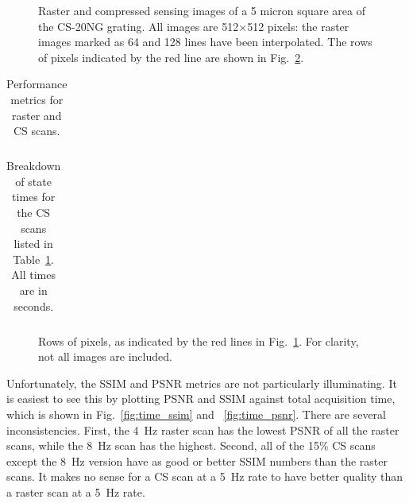 \documentclass[twocolumn,oneside]{IEEEtran/IEEEtran}
\begin{document}
\begin{figure}
  
  \caption{Raster and compressed sensing images of a 5 micron square area of the
     CS-20NG grating. All images are 512$\times$512 pixels: the raster images marked as 64 and 128 lines have been interpolated. The rows of pixels
     indicated by the red line are shown in Fig.~\ref{fig:pixel_rows}.}
  \label{fig:resultsF1_images}
\end{figure}



\begin{table}[t!]
  \centering
  \caption{Performance metrics for raster and CS scans.}
  \begin{tabular}{cccccc}
    
  \end{tabular}
  \label{tab:rast_vs_cs_v1}
\end{table}

\begin{table}[t!]
  \centering
  \caption{Breakdown of state times for the CS scans listed in
    Table~\ref{tab:rast_vs_cs_v1}. All times are in seconds.}
  \label{tab:final_state_times}
  \begin{tabular}{ccccccc}
    
  \end{tabular}
\end{table}

\begin{figure}[t!]
  
  \caption{Rows of pixels, as indicated by the red lines in
    Fig.~\ref{fig:resultsF1_images}. For clarity, not all images are included.}
  \label{fig:pixel_rows}
\end{figure}

Unfortunately, the SSIM and PSNR metrics are not particularly illuminating. It
is easiest to see this by plotting PSNR and SSIM against total acquisition time,
which is shown in Fig.~\ref{fig:time_ssim} and ~\ref{fig:time_psnr}. There are several
inconsistencies. First, the 4~Hz raster scan has the lowest PSNR of all the
raster scans, while the 8~Hz scan has the highest. Second, all of the 15\% CS
scans except the 8~Hz version have as good or better SSIM numbers than the
raster scans. It makes no sense for a CS scan at a 5~Hz rate to have better
quality than a raster scan at a 5~Hz rate.

\end{document}
